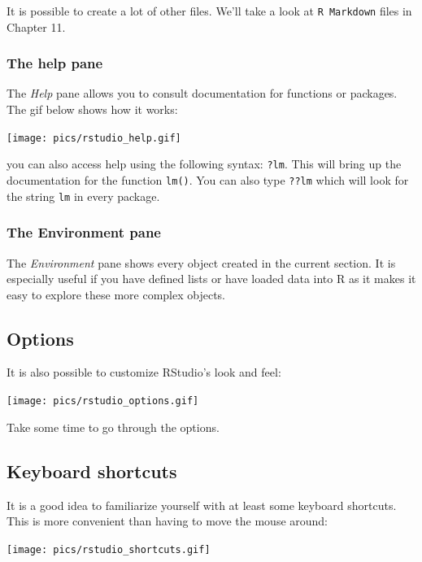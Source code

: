 \documentclass[
]{article}
\begin{document}
It is possible to create a lot of other files. We'll take a look at \texttt{R\ Markdown} files in Chapter 11.

\hypertarget{the-help-pane}{%
\subsubsection{The help pane}\label{the-help-pane}}

The \emph{Help} pane allows you to consult documentation for functions or packages. The gif below shows
how it works:

\texttt{[image: pics/rstudio\_help.gif]}

you can also access help using the following syntax: \texttt{?lm}. This will bring up the documentation for
the function \texttt{lm()}. You can also type \texttt{??lm} which will look for the string \texttt{lm} in every package.

\hypertarget{the-environment-pane}{%
\subsubsection{The Environment pane}\label{the-environment-pane}}

The \emph{Environment} pane shows every object created in the current section. It is especially useful
if you have defined lists or have loaded data into R as it makes it easy to explore these more
complex objects.

\hypertarget{options}{%
\subsection{Options}\label{options}}

It is also possible to customize RStudio's look and feel:

\texttt{[image: pics/rstudio\_options.gif]}

Take some time to go through the options.

\hypertarget{keyboard-shortcuts}{%
\subsection{Keyboard shortcuts}\label{keyboard-shortcuts}}

It is a good idea to familiarize yourself with at least some keyboard shortcuts. This is more
convenient than having to move the mouse around:

\texttt{[image: pics/rstudio\_shortcuts.gif]}
\end{document}
